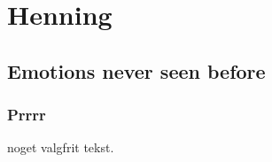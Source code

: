 \chapter{Henning}
\section{Emotions never seen before}
\subsection{Prrrr}
\newpage
noget valgfrit tekst.
